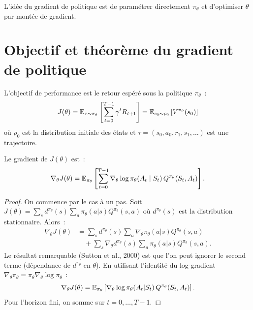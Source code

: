 L'id\'ee du gradient de politique est de param\'etrer directement $\pi_\theta$
et d'optimiser $\theta$ par mont\'ee de gradient.

\section{Objectif et th\'eor\`eme du gradient de politique}

\begin{definition}
L'objectif de performance est le retour esp\'er\'e sous la politique $\pi_\theta$~:
\[
    J(\theta) = \mathbb{E}_{\tau \sim \pi_\theta}\left[\sum_{t=0}^{T-1} \gamma^t R_{t+1}\right]
    = \mathbb{E}_{s_0 \sim \rho_0}\left[V^{\pi_\theta}(s_0)\right]
\]
o\`u $\rho_0$ est la distribution initiale des \'etats et $\tau = (s_0, a_0, r_1, s_1, \ldots)$
est une trajectoire.
\end{definition}

\begin{theoreme}
\label{thm:policy_gradient}
Le gradient de $J(\theta)$ est~:
\[
    \nabla_\theta J(\theta) = \mathbb{E}_{\pi_\theta}\left[
    \sum_{t=0}^{T-1} \nabla_\theta \log \pi_\theta(A_t \mid S_t) \, Q^{\pi_\theta}(S_t, A_t)
    \right].
\]
\end{theoreme}

\begin{proof}
On commence par le cas \`a un pas. Soit $J(\theta) = \sum_s d^{\pi_\theta}(s)
\sum_a \pi_\theta(a|s) Q^{\pi_\theta}(s,a)$ o\`u $d^{\pi_\theta}(s)$ est la
distribution stationnaire. Alors~:
\begin{align*}
    \nabla_\theta J(\theta)
    &= \sum_s d^{\pi_\theta}(s) \sum_a \nabla_\theta \pi_\theta(a|s) Q^{\pi_\theta}(s,a) \\
    &\quad + \sum_s \nabla_\theta d^{\pi_\theta}(s) \sum_a \pi_\theta(a|s) Q^{\pi_\theta}(s,a).
\end{align*}
Le r\'esultat remarquable (Sutton et al., 2000) est que l'on peut ignorer le
second terme (d\'ependance de $d^{\pi_\theta}$ en $\theta$). En utilisant
l'identit\'e du log-gradient $\nabla_\theta \pi_\theta = \pi_\theta \nabla_\theta \log \pi_\theta$~:
\[
    \nabla_\theta J(\theta) = \mathbb{E}_{\pi_\theta}\left[
    \nabla_\theta \log \pi_\theta(A_t | S_t) \, Q^{\pi_\theta}(S_t, A_t)\right].
\]
Pour l'horizon fini, on somme sur $t = 0, \ldots, T-1$.
\end{proof}

